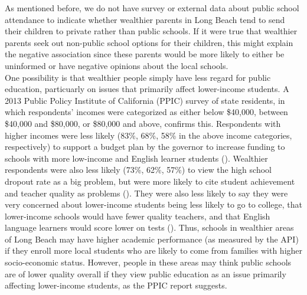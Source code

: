 \indent
As mentioned before, we do not have survey or external data about public school attendance to indicate whether wealthier parents in Long Beach tend to send their children to private rather than public schools.  If it were true that wealthier parents seek out non-public school options for their children, this might explain the negative association since these parents would be more likely to either be uninformed or have negative opinions about the local schools.  \\
\indent
One possibility is that wealthier people simply have less regard for public education, particuarly on issues that primarily affect lower-income students.  A 2013 Public Policy Institute of California (PPIC) survey of state residents, in which respondents' incomes were categorized as either below \$40,000, between \$40,000 and \$80,000, or \$80,000 and above, confirms this.  Respondents with higher incomes were less likely (83\%, 68\%, 58\% in the above income categories, respectively) to support a budget plan by the governor to increase funding to schools with more low-income and English learner students (\citealt[p. 8]{Bal13}).  Wealthier respondents were also less likely (73\%, 62\%, 57\%) to view the high school dropout rate as a big problem, but were more likely to cite student achievement and teacher quality as problems (\citealt[p. 15]{Bal13}).  They were also less likely to say they were very concerned about lower-income students being less likely to go to college, that lower-income schools would have fewer quality teachers, and that English language learners would score lower on tests (\citealt[p. 18]{Bal13}).  Thus, schools in wealthier areas of Long Beach may have higher academic performance (as measured by the API) if they enroll more local students who are likely to come from families with higher socio-economic status.  However, people in these areas may think public schools are of lower quality overall if they view public education as an issue primarily affecting lower-income students, as the PPIC report suggests.





